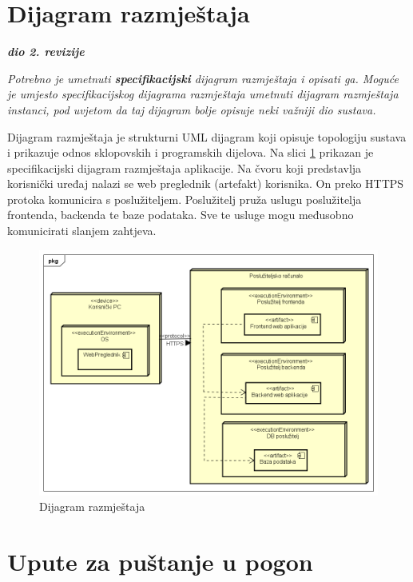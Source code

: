 			\eject 
		
		
		\section{Dijagram razmještaja}
			
			\textbf{\textit{dio 2. revizije}}
			
			 \textit{Potrebno je umetnuti \textbf{specifikacijski} dijagram razmještaja i opisati ga. Moguće je umjesto specifikacijskog dijagrama razmještaja umetnuti dijagram razmještaja instanci, pod uvjetom da taj dijagram bolje opisuje neki važniji dio sustava.}
			 
			 Dijagram razmještaja je strukturni UML dijagram koji opisuje topologiju sustava i prikazuje odnos sklopovskih i programskih dijelova. Na slici \ref{fig:dijagramrazmjestaja} prikazan je specifikacijski dijagram razmještaja aplikacije. Na čvoru koji predstavlja korisnički uređaj nalazi se web preglednik (artefakt) korisnika. On preko HTTPS protoka komunicira s poslužiteljem. Poslužitelj pruža uslugu poslužitelja frontenda, backenda te baze podataka. Sve te usluge mogu međusobno komunicirati slanjem zahtjeva.
			 
			 \begin{figure}[H]
			 	\includegraphics[width=\textwidth]{dijagrami/Dijagram razmjestaja.PNG} %
			 	\caption{Dijagram razmještaja}
			 	\label{fig:dijagramrazmjestaja} %
			 \end{figure}
			
			\eject 
		
		\section{Upute za puštanje u pogon}
		
